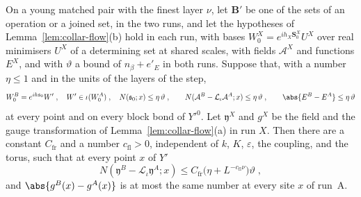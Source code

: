 %

\begin{lemma}\label{lem:collar-flow-runs}
On a young matched pair with the finest layer $\nu$, let $\mathbf B'$ be one of the sets of an operation or a joined set, in the two runs, and let the hypotheses of Lemma~\ref{lem:collar-flow}(b) hold in each run, with bases $W_0^X = e^{ih_X\mathbf S_0^X}U^X$ over real minimisers $U^X$ of a determining set at shared scales, with fields $\mathcal A^X$ and functions $E^X$, and with $\vartheta$ a bound of $n_\beta + e'_E$ in both runs. Suppose that, with a number $\eta \leq 1$ and in the units of the layers of the step,
\[
    W_0^B = e^{ih\mathfrak s_0}W'\;,\quad W' \in \iota(W_0^A)\;,\quad N(\mathfrak s_0; x) \leq \eta\,\vartheta\;,
    \qquad
    N(\mathcal A^B - \mathcal L_\iota\mathcal A^A; x) \leq \eta\,\vartheta\;,
    \qquad
    \abs{E^B - E^A} \leq \eta\,\vartheta
\]
at every point and on every block bond of $Y'^0$. Let $\mathfrak y^X$ and $g^X$ be the field and the gauge transformation of Lemma~\ref{lem:collar-flow}(a) in run $X$. Then there are a constant $C_{\mathrm{fr}}$ and a number $c_{\mathrm{fl}} > 0$, independent of $k$, $K$, $\varepsilon$, the coupling, and the torus, such that at every point $x$ of $Y'$
\[
    N(\mathfrak y^B - \mathcal L_\iota\mathfrak y^A; x) \leq C_{\mathrm{fr}}\bigl(\eta + L^{-c_{\mathrm{fl}}\nu}\bigr)\vartheta\;,
\]
and $\abs{g^B(x) - g^A(x)}$ is at most the same number at every site $x$ of run~A.
\end{lemma}

